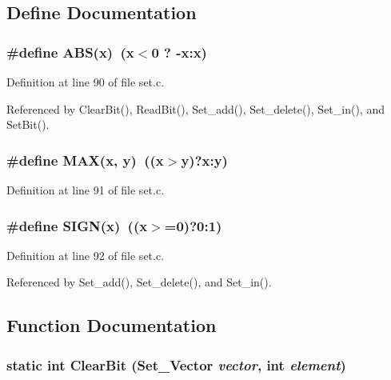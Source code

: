 \subsection{Define Documentation}
\subsubsection{\setlength{\rightskip}{0pt plus 5cm}\#define ABS(x)~(x$<$0 ? -x:x)}\label{set_8c_996f7be338ccb40d1a2a5abc1ad61759}




Definition at line 90 of file set.c.

Referenced by Clear\-Bit(), Read\-Bit(), Set\_\-add(), Set\_\-delete(), Set\_\-in(), and Set\-Bit().
\subsubsection{\setlength{\rightskip}{0pt plus 5cm}\#define MAX(x, y)~((x$>$y)?x:y)}\label{set_8c_acc3ee1a7f283f8ef65cea31f4436a95}




Definition at line 91 of file set.c.
\subsubsection{\setlength{\rightskip}{0pt plus 5cm}\#define SIGN(x)~((x$>$=0)?0:1)}\label{set_8c_8c5ff70b6b28cd0157c50a22406f92c4}




Definition at line 92 of file set.c.

Referenced by Set\_\-add(), Set\_\-delete(), and Set\_\-in().

\subsection{Function Documentation}
\subsubsection{\setlength{\rightskip}{0pt plus 5cm}static int Clear\-Bit (\bf{Set\_\-Vector} {\em vector}, int {\em element})\hspace{0.3cm}{\tt  [static]}}\label{set_8c_3f2ece109b9e87d380f3b5adec3adf3e}




